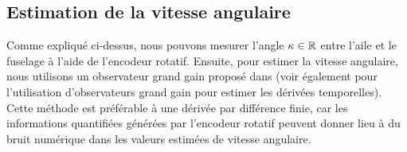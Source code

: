 
\subsection{Estimation de la vitesse angulaire}

Comme expliqué ci-dessus, nous pouvons mesurer l'angle $\kappa \in {\mathbb R}$ entre l'aile et le fuselage à l'aide de l'encodeur rotatif. Ensuite, pour estimer la vitesse angulaire, nous utilisons un observateur grand gain proposé dans \cite{203613} (voir également \cite{1032320} pour l'utilisation d'observateurs grand gain pour estimer les dérivées temporelles). Cette méthode est préférable à une dérivée par différence finie, car les informations quantifiées générées par l'encodeur rotatif peuvent donner lieu à du bruit numérique dans les valeurs estimées de vitesse angulaire.


